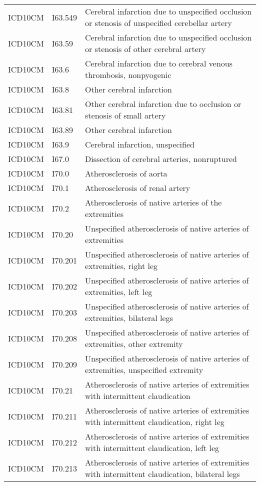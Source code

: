 \begin{longtable}{p{}p{}p{}}
  ICD10CM & I63.549 & Cerebral infarction due to unspecified occlusion or stenosis of unspecified cerebellar artery \\ 
  ICD10CM & I63.59 & Cerebral infarction due to unspecified occlusion or stenosis of other cerebral artery \\ 
  ICD10CM & I63.6 & Cerebral infarction due to cerebral venous thrombosis, nonpyogenic \\ 
  ICD10CM & I63.8 & Other cerebral infarction \\ 
  ICD10CM & I63.81 & Other cerebral infarction due to occlusion or stenosis of small artery \\ 
  ICD10CM & I63.89 & Other cerebral infarction \\ 
  ICD10CM & I63.9 & Cerebral infarction, unspecified \\ 
  ICD10CM & I67.0 & Dissection of cerebral arteries, nonruptured \\ 
  ICD10CM & I70.0 & Atherosclerosis of aorta \\ 
  ICD10CM & I70.1 & Atherosclerosis of renal artery \\ 
  ICD10CM & I70.2 & Atherosclerosis of native arteries of the extremities \\ 
  ICD10CM & I70.20 & Unspecified atherosclerosis of native arteries of extremities \\ 
  ICD10CM & I70.201 & Unspecified atherosclerosis of native arteries of extremities, right leg \\ 
  ICD10CM & I70.202 & Unspecified atherosclerosis of native arteries of extremities, left leg \\ 
  ICD10CM & I70.203 & Unspecified atherosclerosis of native arteries of extremities, bilateral legs \\ 
  ICD10CM & I70.208 & Unspecified atherosclerosis of native arteries of extremities, other extremity \\ 
  ICD10CM & I70.209 & Unspecified atherosclerosis of native arteries of extremities, unspecified extremity \\ 
  ICD10CM & I70.21 & Atherosclerosis of native arteries of extremities with intermittent claudication \\ 
  ICD10CM & I70.211 & Atherosclerosis of native arteries of extremities with intermittent claudication, right leg \\ 
  ICD10CM & I70.212 & Atherosclerosis of native arteries of extremities with intermittent claudication, left leg \\ 
  ICD10CM & I70.213 & Atherosclerosis of native arteries of extremities with intermittent claudication, bilateral legs \\ 

\end{longtable}
